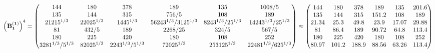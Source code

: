 \documentclass[10pt,a4paper]{article}
\begin{document}
	\[
		\left(\bold{B_1^{(1)}}\right)^{4} = 
		\begin{pmatrix}
			{{144}}{} & {{180}}{} & {{378}}{} & {{189}}{} & {{135}}{} & {{1008}} / {{5}} \\
			{{135}}{} & {{144}}{} & {{315}}{} & {{756}} / {{5}} & {{108}}{} & {{189}}{} \\
			{{2}{1215^ {1 / 3}}}{} & {{2}{2025^ {1 / 3}}}{} & {{14}{45^ {1 / 3}}}{} & {{56}{243^ {1 / 3}}} / {{3125^ {1 / 3}}} & {{8}{243^ {1 / 3}}} / {{25^ {1 / 3}}} & {{14}{243^ {1 / 3}}} / {{25^ {1 / 3}}} \\
			{{81}}{} & {{432}} / {{5}} & {{189}}{} & {{2268}} / {{25}} & {{324}} / {{5}} & {{567}} / {{5}} \\
			{{180}}{} & {{225}}{} & {{420}}{} & {{180}}{} & {{108}}{} & {{252}}{} \\
			{{32}{81^ {1 / 3}}} / {{5^ {1 / 3}}} & {{8}{2025^ {1 / 3}}}{} & {{224}{3^ {1 / 3}}} / {{5^ {1 / 3}}} & {{7}{2025^ {1 / 3}}}{} & {{253125^ {1 / 3}}}{} & {{224}{81^ {1 / 3}}} / {{625^ {1 / 3}}} \\
		\end{pmatrix}
		\approx
		\begin{pmatrix}
			144      & 180      & 378      & 189      & 135      & 201.6    \\
			135      & 144      & 315      & 151.2    & 108      & 189      \\
			21.34    & 25.3     & 49.8     & 23.9     & 17.07    & 29.88    \\
			81       & 86.4     & 189      & 90.72    & 64.8     & 113.4    \\
			180      & 225      & 420      & 180      & 108      & 252      \\
			80.97    & 101.2    & 188.9    & 88.56    & 63.26    & 113.4    \\
		\end{pmatrix}
	\]
\end{document}
